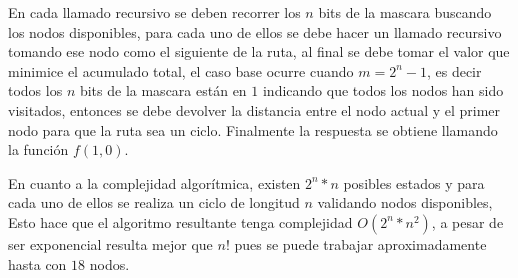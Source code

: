 \documentclass[12pt, a4paper]{article}
\newcommand\cppfile[2][]{

}
\begin{document}
	En cada llamado recursivo se deben recorrer los $n$ bits de la mascara buscando los nodos disponibles, 
	para cada uno de ellos se debe hacer un llamado recursivo tomando ese nodo como el siguiente de la ruta, al final 
	se debe tomar el valor que minimice el acumulado total, el caso base ocurre cuando $m=2^{n}-1$, es decir todos los  
	$n$ bits de la mascara están en $1$ indicando que todos los nodos han sido visitados, entonces se debe devolver la 
	distancia entre el nodo actual y el primer nodo para que la ruta sea un ciclo. Finalmente la respuesta se  
	obtiene llamando la función $f(1,0)$.
	
	\cppfile[10-26]{Programacion_dinamica/codigos/TSP.cpp}
	
	En cuanto a la complejidad algorítmica, existen $2^{n}*n$ posibles estados y para cada uno de ellos se realiza un 
	ciclo de longitud $n$ validando nodos disponibles, Esto hace que el algoritmo resultante tenga complejidad 
	$O(2^{n}*n^2)$, a pesar de ser exponencial resulta mejor que $n!$ pues se puede trabajar aproximadamente hasta con 
	$18$ nodos.
	
	
\end{document}
